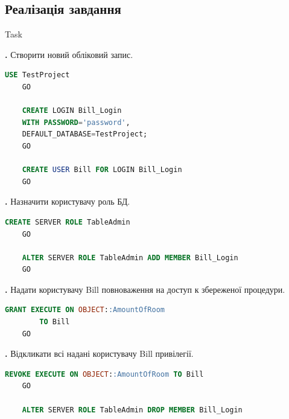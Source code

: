 \documentclass[a4paper,12pt]{article}
\newcommand{\RomanNumeralCaps}[1]{\MakeUppercase{\romannumeral #1}}
\begin{document}
\newpage
	\begin{center}
		\section*{\bfseries{Реалізація завдання}}
	\end{center}
    \begin{center}
        \Large{Task \RomanNumeralCaps{1}}
    \end{center}
	\textbf{\RomanNumeralCaps{1}.\RomanNumeralCaps{1}}
	Створити новий обліковий запис.
	\begin{lstlisting}[language=SQL]
	USE TestProject
	GO
	
	CREATE LOGIN Bill_Login
	WITH PASSWORD='password',
	DEFAULT_DATABASE=TestProject;
	GO
	
	CREATE USER Bill FOR LOGIN Bill_Login
	GO
	\end{lstlisting}

	\textbf{\RomanNumeralCaps{1}.\RomanNumeralCaps{2}}
	Назначити користувачу роль БД.
	\begin{lstlisting}[language=SQL]
	CREATE SERVER ROLE TableAdmin 
	GO  

	ALTER SERVER ROLE TableAdmin ADD MEMBER Bill_Login
	GO 
	\end{lstlisting}

	\textbf{\RomanNumeralCaps{1}.\RomanNumeralCaps{3}}
	Надати користувачу Bill повноваження на доступ к збереженої процедури.
	\begin{lstlisting}[language=SQL]
	GRANT EXECUTE ON OBJECT::AmountOfRoom  
		TO Bill
	GO
	\end{lstlisting}

	\textbf{\RomanNumeralCaps{1}.\RomanNumeralCaps{4}}
	Відкликати всі надані користувачу Bill привілегії.
	\begin{lstlisting}[language=SQL]
	REVOKE EXECUTE ON OBJECT::AmountOfRoom TO Bill
	GO
	
	ALTER SERVER ROLE TableAdmin DROP MEMBER Bill_Login
	\end{lstlisting}
\end{document}
